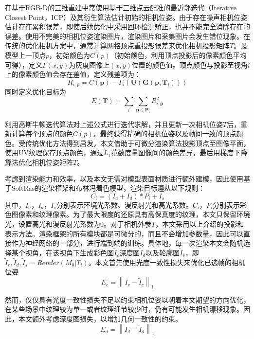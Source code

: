 在基于RGB-D的三维重建中常使用基于三维点云配准的最近邻迭代（Iterative Closest Point，ICP）及其衍生算法估计初始的相机位姿。由于存在噪声相机位姿估计存在累积误差，即使后续优化中采用回环检测矫正，也并不能完全消除存在的误差。使用不完美的相机位姿渲染图片，渲染图片和采集图片会发生错位现象。在传统的优化相机方案中，通常计算网格顶点重投影误差来优化相机投影矩阵$T$。设模型上一顶点$p$，初始颜色为$C(p)$（初始颜色，利用顶点投影后的像素颜色平均可得），定义$\Gamma(x,y) $为灰度图像上$(x,y)$位置的颜色值。顶点颜色与投影至视角$i$上的像素颜色值会存在差值，定义残差项为：
\begin{equation}
	R_{i, \mathbf{p}}=C(\mathbf{p})-\Gamma_{i}\left(\mathbf{U}\left(\mathbf{G}\left(\mathbf{p}, \mathbf{T}_{i}\right)\right)\right)
\end{equation}
同时定义优化目标为
\begin{equation}
	E(\mathbf{T})=\sum_{i} \sum_{\mathbf{p} \in \mathbf{P}_{i}} R_{i, \mathbf{p}}^{2}
\end{equation}

利用高斯牛顿迭代算法对上述公式进行迭代求解，并且更新一次相机位姿$T$后，重新计算每个顶点的颜色$C(p)$，最终获得精确的相机位姿以及帧间一致的顶点颜色。受传统优化方法得到启发，本文借助于可微分渲染算法投影顶点至图像平面，使用UV纹理保存顶点颜色，通过$L_1$范数度量图像间的颜色差异，最后用梯度下降算法优化相机位姿矩阵$T$。\par
考虑到渲染能力和效率，以及本文无需对模型表面材质进行额外建模，因此使用基于SoftRas的渲染框架和布林冯着色模型，渲染目标遵从以下规则：
\begin{equation}
	C_i = (I_a + I_d) * P_i + I_s
\end{equation}
其中，$I_a$，$I_d$，$I_s$分别表示环境光系数、漫反射光和高光系数。$C_i$，$P_i$分别表示彩色图像素和纹理像素。为了最大限度的还原具有高保真度的纹理，本文只保留环境光，设置高光和漫反射光系数为0。对于相机外参$T$，本文采用以上介绍的投影和表示方法。渲染框架的所有模块都是可微分的，而且不会增加参数量，因此可以直接作为神经网络的一部分，进行端到端的训练。具体地，每一次渲染本文会随机选择某个视角，在该视角下生成彩色图$\tilde{I}_c$深度图$\tilde{I}_d$以及轮廓图$\tilde{I}_s$，即$\tilde{I}_c,\tilde{I}_d,\tilde{I}_s = Render(M_0|T_i)$。本文首先使用光度一致性损失来优化已选帧的相机位姿
\begin{equation}
	E_c = \left \| I_c - \tilde{I}_c  \right \|_1 
\end{equation}

然而，仅仅具有光度一致性损失不足以约束相机位姿以朝着本文期望的方向优化，在某些场景中纹理较为单一或者纹理细节较少时，仍有可能发生相机漂移现象。因此，本文额外考虑深度图损失，以增加几何一致性的约束。
\begin{equation}
	E_d = \left \| I_d - \tilde{I}_d  \right \|_1 
\end{equation}

